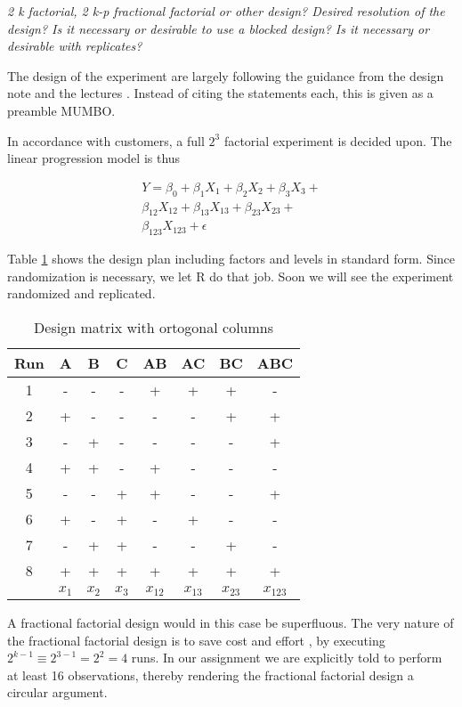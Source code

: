\textit{2 k factorial,
2 k-p fractional factorial or other design?
Desired resolution of the design?
Is it necessary or desirable to use a blocked design?
Is it necessary or desirable with replicates?}

The design of the experiment are largely following the guidance from the design note \parencite[]{tyssedal} and the lectures \parencite[]{lectures}. Instead of citing the statements each, this is given as a preamble MUMBO.

In accordance with customers, a full $2^3$ factorial experiment is decided upon. The linear progression model is thus

\begin{multline}
    Y = \beta_0 + \beta_1 X_1 + \beta_2 X_2 + \beta_3 X_3 + \\
    \beta_{12} X_{12} + 
    \beta_{13} X_{13} + \beta_{23} X_{23} + \\ \beta_{123} X_{123} + \epsilon
\end{multline}

Table \ref{table:design} shows the design plan including factors and levels in standard form. Since randomization is necessary, we let R do that job. Soon we will see the experiment randomized and replicated.

\begin{table}[H]
\centering
\begin{tabular}{ |c | c c c c c c c | } 
 \hline
 Run & A & B & C & AB & AC & BC & ABC \\ 
 \hline
 1 & - & - & - & + & + & + & -  \\
 2 & + & - & - & - & - & + & +  \\
 3 & - & + & - & - & - & - & +  \\
 4 & + & + & - & + & - & - & -  \\
 5 & - & - & + & + & - & - & +  \\
 6 & + & - & + & - & + & - & -  \\
 7 & - & + & + & - & - & + & -  \\
 8 & + & + & + & + & + & + & +  \\
 \hline
   & $x_1$ & $x_2$ & $x_3$ & $x_{12}$ & $x_{13}$  & $x_{23}$ & $x_{123}$  \\
 \hline
\end{tabular}
\caption{Design matrix with ortogonal columns}
\label{table:design}
\end{table}

A fractional factorial design would in this case be superfluous. The very nature of the fractional factorial design is to save cost and effort \parencite[20]{tyssedal}, by executing $2^{k-1} \equiv 2^{3-1} = 2^2 = 4$ runs. In our assignment we are explicitly told to perform at least 16 observations, thereby rendering the fractional factorial design a circular argument. 

